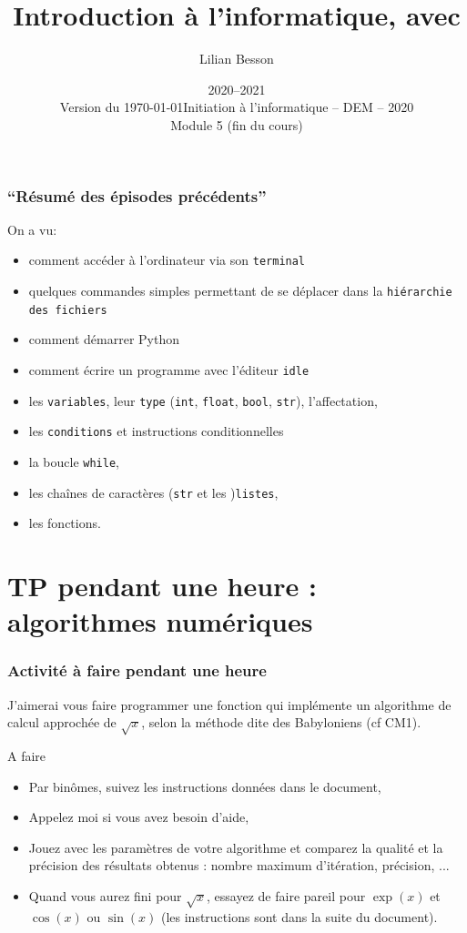 \documentclass{beamer}
\title{Introduction à l'informatique, avec \pyth{}}
\author{Lilian Besson}
\date{2020--2021\\Version du \today}
\institute%
{
  ENS Rennes
  }
\date%
[Info -- DEM -- 2020]{Initiation à l'informatique -- DEM -- 2020\\Module 5 (fin du cours)}
\newcommand{\pyth}{{\sc Python}}
\newcommand{\prog}[1]{\alert{\texttt{#1}}}
\begin{document}
\frame{\titlepage}

\section[Outline]{}
\frame{\tableofcontents}
\frame
{
\frametitle{``Résumé des épisodes précédents''}
{
On a vu:
\begin{itemize}
  \item comment accéder à l'ordinateur via son \prog{terminal}
  \item quelques commandes simples permettant de se déplacer dans la \prog{hiérarchie des fichiers}
  \item comment démarrer \pyth{}
  \item comment écrire un programme avec l'éditeur \prog{idle}
  \item les \prog{variables}, leur \prog{type} (\prog{int}, \prog{float}, \prog{bool}, \prog{str}), l'affectation,
  \item les \prog{conditions} et instructions conditionnelles
  \item la boucle \prog{while},
  \item les chaînes de caractères (\prog{str} et les )\prog{listes},
  \item les fonctions.
\end{itemize}
}
}

\section{TP pendant une heure : algorithmes numériques}

\frame
{
\frametitle{Activité à faire pendant une heure}

J'aimerai vous faire programmer une fonction qui implémente un algorithme de calcul approchée de $\sqrt{x}$, selon la méthode dite des Babyloniens (cf CM1).

{\footnotesize
\begin{block}{A faire}
\begin{itemize}
\item Par binômes, suivez les instructions données dans le document,
\item Appelez moi si vous avez besoin d'aide,
\item Jouez avec les paramètres de votre algorithme et comparez la qualité et la précision des résultats obtenus : nombre maximum d'itération, précision, ...
\item Quand vous aurez fini pour $\sqrt{x}$, essayez de faire pareil pour $\exp(x)$ et $\cos(x)$ ou $\sin(x)$ (les instructions sont dans la suite du document).
\end{itemize}
\end{block}
}
}
\end{document}
